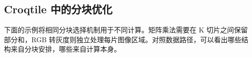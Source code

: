 \subsection*{Croqtile 中的分块优化}

下面的示例将相同分块选择机制用于不同计算。矩阵乘法需要在 K 切片之间保留部分和，RGB 转灰度则独立处理每片图像区域。对照数据路径，可以看出哪些结构来自分块安排，哪些来自计算本身。
